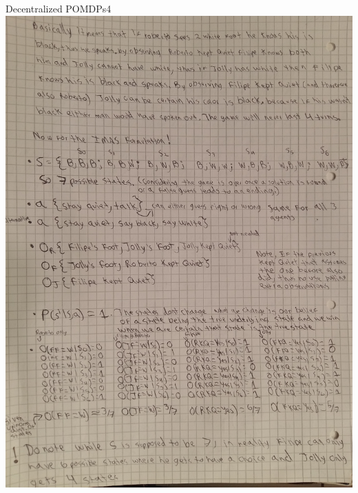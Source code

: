 \begin{questions}
\begin{question}{Decentralized POMDPs}{4}
	\includegraphics[scale=0.2]{p2.jpg}
		\newpage


\end{question}
\end{questions}
